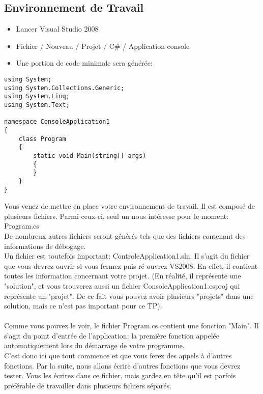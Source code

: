 \documentclass[12pt,a4paper]{report}
\begin{document}
\subsection{Environnement de Travail}
\begin{itemize}
\item Lancer Visual Studio 2008
\item Fichier / Nouveau / Projet / C\# / Application console
\item Une portion de code minimale sera générée:
\end{itemize}
\begin{lstlisting}
using System;
using System.Collections.Generic;
using System.Linq;
using System.Text;

namespace ConsoleApplication1
{
    class Program
    {
        static void Main(string[] args)
        { 
        }
    }
}
\end{lstlisting}		
Vous venez de mettre en place votre environnement de travail. Il est composé de plusieurs fichiers.
Parmi ceux-ci, seul un nous intéresse pour le moment: Program.cs\\
De nombreux autres fichiers seront générés tels que des fichiers contenant des informations de débogage.\\
Un fichier est toutefois important: ControleApplication1.sln. Il s'agit du fichier que vous devrez ouvrir si vous fermez puis ré-ouvrez VS2008. En effet,
il contient toutes les information concernant votre projet. (En réalité, il représente une "solution", et vous trouverez aussi un fichier ConsoleApplication1.csproj qui représente un "projet".
De ce fait vous pouvez avoir plusieurs "projets" dans une solution, mais ce n'est pas important pour ce TP).\\
\\
Comme vous pouvez le voir, le fichier Program.cs contient une fonction "Main". Il s'agit du point d'entrée de l'application: la première fonction appelée automatiquement lors du démarrage de votre programme.\\
C'est donc ici que tout commence et que vous ferez des appels à d'autres fonctions. Par la suite, nous allons écrire d'autres fonctions que vous devrez tester. Vous les écrirez dans ce fichier, mais gardez en tête qu'il
est parfois préférable de travailler dans plusieurs fichiers séparés.
\end{document}
